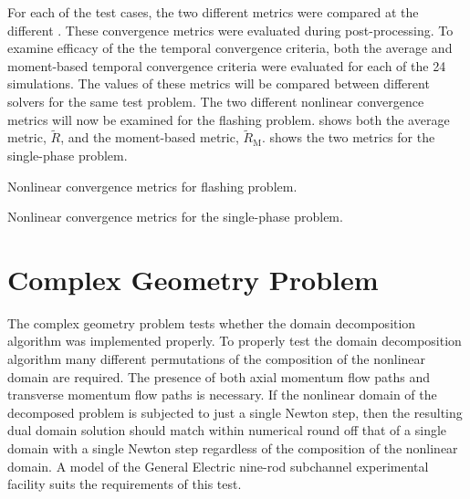For each of the test cases, the two different metrics were compared at the different \dtmax{}.
These convergence metrics were evaluated during post-processing.
To examine efficacy of the the temporal convergence criteria, both the average and moment-based temporal convergence criteria were evaluated for each of the 24 simulations.
The values of these metrics will be compared between different solvers for the same test problem. 
The two different nonlinear convergence metrics will now be examined for the flashing problem.
 shows both the average metric, $\tilde{R}$, and the moment-based metric, $\tilde{R}_{\text{M}}$.
 shows the two metrics for the single-phase problem.

\begin{table}[h!tb]
\centering
\singlespace

\caption{Nonlinear convergence metrics for flashing problem.}
\label{tab:flashingMetric}
\end{table}

\begin{table}[h!tb]
\centering
\singlespace

\caption{Nonlinear convergence metrics for the single-phase problem.}
\label{tab:singleMetric}
\end{table}

\section{Complex Geometry Problem}
\label{sect:complexProblem}
The complex geometry problem tests whether the domain decomposition algorithm was implemented properly.
To properly test the domain decomposition algorithm many different permutations of the composition of the nonlinear domain are required.
The presence of both axial momentum flow paths and transverse momentum flow paths is necessary.
If the nonlinear domain of the decomposed problem is subjected to just a single Newton step, then the resulting dual domain solution should match within numerical round off that of a single domain with a single Newton step regardless of the composition of the nonlinear domain.
A model of the General Electric nine-rod subchannel experimental facility \cite{Lahey1970} suits the requirements of this test.

